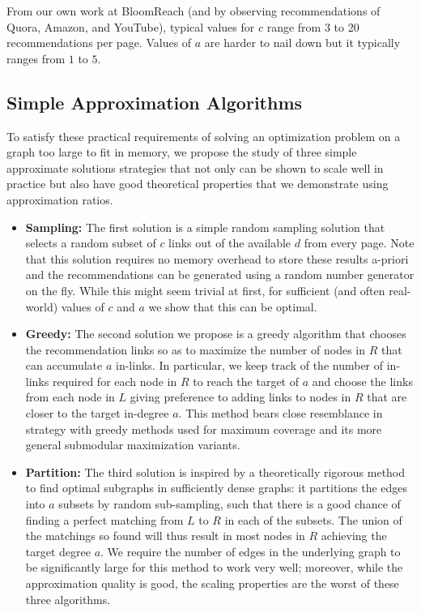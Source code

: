 From our own work at BloomReach (and by observing recommendations of Quora, Amazon, and YouTube), typical values for $c$ range from 3 to 20
recommendations per page. Values of $a$ are harder to nail down but it
typically ranges from $1$ to $5$. 


\subsection{Simple Approximation Algorithms}

To satisfy these practical requirements of solving an optimization problem on a graph too large to fit in memory,
we propose the study of three simple approximate solutions strategies that not only can be shown to scale well in practice but also have good theoretical
properties that we demonstrate using approximation ratios.

\begin{itemize}

\item {\bf Sampling:} The first solution is a simple random sampling
  solution that selects a random subset of $c$ links out of the
  available $d$ from every page. Note that this solution requires no
  memory overhead to store these results a-priori and the
  recommendations can be generated using a random number generator on
  the fly. While this might seem trivial at first, for sufficient (and
  often real-world) values of $c$ and $a$ we show that this can be
  optimal. 
  
\item {\bf Greedy:} The second solution we propose is a greedy
  algorithm that chooses the recommendation links so as to maximize
  the number of nodes in $R$ that can accumulate $a$ in-links. In
  particular, we keep track of the number of in-links required for
  each node in $R$ to reach the target of $a$ and choose the links
  from each node in $L$ giving preference to adding links to nodes in
  $R$ that are closer to the target in-degree $a$. This method bears close resemblance in strategy with greedy methods used for maximum coverage and its more general submodular maximization variants.

\item {\bf Partition:} The third solution is inspired by a
  theoretically rigorous method to find optimal subgraphs in
  sufficiently dense graphs: it partitions the edges into $a$ subsets
  by random sub-sampling, such that there is a good chance of finding
  a perfect matching from $L$ to $R$ in each of the subsets. The union
  of the matchings so found will thus result in most nodes in $R$
  achieving the target degree $a$. We require the number of edges in
  the underlying graph to be significantly large for this method to
  work very well; moreover, while the approximation quality is good, the
  scaling properties are the worst of these three algorithms.
\end{itemize}

